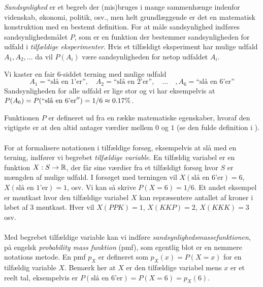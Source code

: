 \emph{Sandsynlighed} er et begreb der (mis)bruges i mange sammenhænge indenfor videnskab, økonomi, politik, osv., men helt grundlæggende er det en matematisk konstruktion med en bestemt definition. For at måle sandsynlighed indføres sandsynlighedsmålet $P$, som er en funktion der bestemmer sandsynligheden for udfald i \emph{tilfældige eksperimenter}. Hvis et tilfældigt eksperiment har mulige udfald $A_1, A_2,\dots$ da vil $P(A_i)$ være sandsynligheden for netop udfaldet $A_i$.
\begin{example}
Vi kaster en fair 6-siddet terning med mulige udfald 
$$A_1 = \text{``slå en 1'er''}, \quad  A_2 = \text{``slå en 2'er''}, \quad \dots \quad, A_6 = \text{``slå en 6'er''}$$
Sandsynligheden for alle udfald er lige stor og vi har eksempelvis at \\
$P(A_6) = P(``\text{slå en 6'er}'') = 1/6 \approx 0.17\%$. 
\end{example}
Funktionen $P$ er defineret ud fra en række matematiske egenskaber, hvoraf den vigtigste er at den altid antager værdier mellem $0$ og $1$ (se den fulde definition i \cite[sektion 1.3]{olofsson2012}). 
\\ \\
For at formalisere notationen i tilfældige forsøg,  eksempelvis at slå med en terning, indfører vi begrebet \textit{tilfældige variable}. En tilfældig variabel er en funktion $X: S \to\mathbb{R}$, der får sine værdier fra et tilfældigt forsøg hvor $S$ er mængden af mulige udfald. I forsøget med terningen vil $X(\text{slå en 6'er}) = 6$, $X(\text{slå en 1'er}) = 1$, osv. Vi kan så skrive $P(X = 6) = 1/6$. Et andet eksempel er møntkast hvor den tilfældige variabel $X$ kan repræsentere antallet af kroner i løbet af 3 møntkast. Hver vil $X(PPK) = 1$, $X(KKP) = 2$, $X(KKK) = 3$ osv.
\\ \\
Med begrebet tilfældige variable kan vi indføre \textit{sandsynlighedsmassefunktionen}, på engelsk \textit{probability mass funktion} (pmf), som egentlig blot er en nemmere notations metode. En pmf $p_X$ er defineret som $p_X(x) = P(X = x)$ for en tilfældig variable $X$. Bemærk her at $X$ er den tilfældige variabel mens $x$ er et reelt tal, eksempelvis er $P(\text{slå en 6'er}) = P(X = 6) = p_X(6)$. 